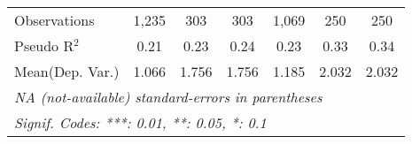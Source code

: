 \begin{tabular}{lcccccc}
   Observations                                                               & 1,235                  & 303                    & 303                    & 1,069                  & 250    & 250\\  
   Pseudo R$^2$                                                               & 0.21                   & 0.23                   & 0.24                   & 0.23                   & 0.33   & 0.34\\  
Mean(Dep. Var.) & 1.066 & 1.756 & 1.756 & 1.185 & 2.032 & 2.032 \\
   \midrule \midrule
   \multicolumn{7}{l}{\emph{NA (not-available) standard-errors in parentheses}}\\
   \multicolumn{7}{l}{\emph{Signif. Codes: ***: 0.01, **: 0.05, *: 0.1}}\\
\end{tabular}
\par\endgroup
